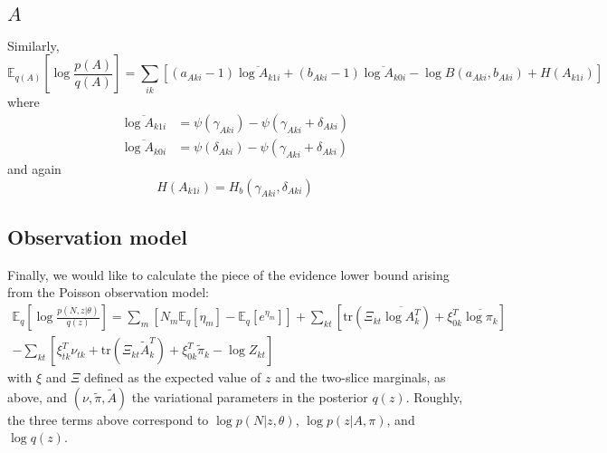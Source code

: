 \documentclass[11pt]{article}
\begin{document}
\subsection{$A$}
Similarly,
\begin{equation}
    \mathbb{E}_{q(A)} \left[\log \frac{p(A)}{q(A)} \right] =
\sum_{ik} \left[ (a_{Aki} - 1) \overline{\log A_{k1i}} + (b_{Aki} - 1) \overline{\log A_{k0i}} - \log B(a_{Aki}, b_{Aki}) + H(A_{k1i}) \right]
\end{equation}
where
\begin{align}
    \overline{\log A_{k1i}} &= \psi(\gamma_{Aki}) - \psi(\gamma_{Aki} + \delta_{Aki}) \\
    \overline{\log A_{k0i}} &= \psi(\delta_{Aki}) - \psi(\gamma_{Aki} + \delta_{Aki})
\end{align}
and again
\begin{equation}
    H(A_{k1i}) = H_b(\gamma_{Aki}, \delta_{Aki})
\end{equation}

\subsection{Observation model}
Finally, we would like to calculate the piece of the evidence lower bound arising from the Poisson observation model:
\begin{multline}
    \label{obsmodel}
    \mathbb{E}_q \left[ \log \frac{p(N, z|\theta)}{q(z)} \right] =
    \sum_{m} \left[
    N_{m} \mathbb{E}_q [\eta_m]
    - \mathbb{E}_q[e^{\eta_m}] \right]
    + \sum_{kt} \left[\mathrm{tr}\left(\Xi_{kt} \overline{\log A_k^T}\right) + \xi_{0k}^T \overline{\log \pi_k} \right] \\
    - \sum_{kt} \left[ \xi_{tk}^T \nu_{tk} + \mathrm{tr}\left(\Xi_{kt} \tilde{A}_k^T\right) + \xi_{0k}^T \tilde{\pi}_k - \log Z_{kt} \right]
\end{multline}
with $\xi$ and $\Xi$ defined as the expected value of $z$ and the two-slice marginals, as above, and $(\nu, \tilde{\pi}, \tilde{A})$ the variational parameters in the posterior $q(z)$. Roughly, the three terms above correspond to $\log p(N|z, \theta)$, $\log p(z|A, \pi)$, and $\log q(z)$.
\end{document}
